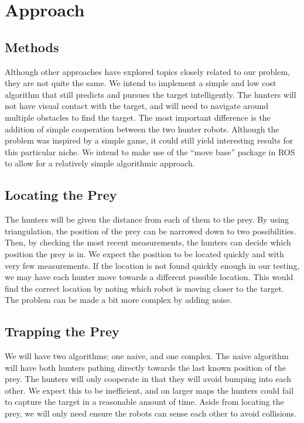 \documentclass[conference]{IEEEtran}
\begin{document}
\section{Approach}

\subsection{Methods}
Although other approaches have explored topics closely related to our problem, they are not quite the same.
We intend to implement a simple and low cost algorithm that still predicts and pursues the target intelligently.
The hunters will not have visual contact with the target, and will need to navigate around multiple obstacles to find the target.
The most important difference is the addition of simple cooperation between the two hunter robots.
Although the problem was inspired by a simple game, it could still yield interesting results for this particular niche.
We intend to make use of the ``move base'' package in ROS to allow for a relatively simple algorithmic approach.

\subsection{Locating the Prey}
The hunters will be given the distance from each of them to the prey.
By using triangulation, the position of the prey can be narrowed down to two possibilities.
Then, by checking the most recent measurements, the hunters can decide which position the prey is in.
We expect the position to be located quickly and with very few measurements.
If the location is not found quickly enough in our testing, we may have each hunter move towards a different possible location.
This would find the correct location by noting which robot is moving closer to the target.
The problem can be made a bit more complex by adding noise.

\subsection{Trapping the Prey}
We will have two algorithms: one naive, and one complex.
The naive algorithm will have both hunters pathing directly towards the last known position of the prey.
The hunters will only cooperate in that they will avoid bumping into each other.
We expect this to be inefficient, and on larger maps the hunters could fail to capture the target in a reasonable amount of time.
Aside from locating the prey, we will only need ensure the robots can sense each other to avoid collisions.
\end{document}
